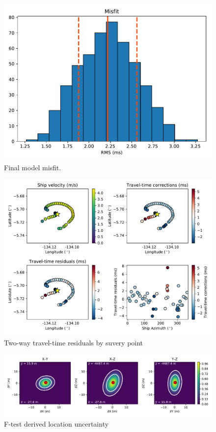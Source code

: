 \documentclass[titlepage, 12pt]{article}
\begin{document}
  \begin{figure}[!htb]
   \centering
   \includegraphics[width=0.7\linewidth]{misfit.pdf}
   \caption{Final model misfit.}
  \end{figure}

  \begin{figure}[!htb]
   \includegraphics[width=\linewidth]{tt_resids.pdf}
   \caption{Two-way travel-time residuals by suvery point}
  \end{figure}
  
  \begin{figure}[!htb]
   \includegraphics[width=\linewidth]{ftest.pdf}
   \caption{F-test derived location uncertainty}
  \end{figure}
  
\end{document}
